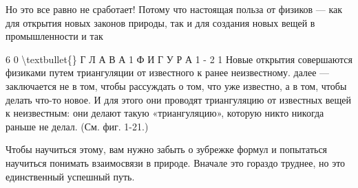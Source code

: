 \documentclass[10pt,oneside]{article}
\begin{document}
Но это все равно не сработает! Потому что настоящая польза от физиков --- как для открытия новых законов природы, так и для создания новых вещей в промышленности и так\par

6 0 \textbackslash{}textbullet\{\} Г Л А В А  1 Ф И Г У Р А  1 - 2 1 Новые открытия совершаются физиками путем триангуляции от известного к ранее неизвестному. далее --- заключается не в том, чтобы рассуждать о том, что уже известно, а в том, чтобы делать что-то новое. И для этого они проводят триангуляцию от известных вещей к неизвестным: они делают такую «триангуляцию», которую никто никогда раньше не делал. (См. фиг. 1-21.)\par

Чтобы научиться этому, вам нужно забыть о зубрежке формул и попытаться научиться понимать взаимосвязи в природе. Вначале это гораздо труднее, но это единственный успешный путь.\par

\clearpage
{}
\end{document}
